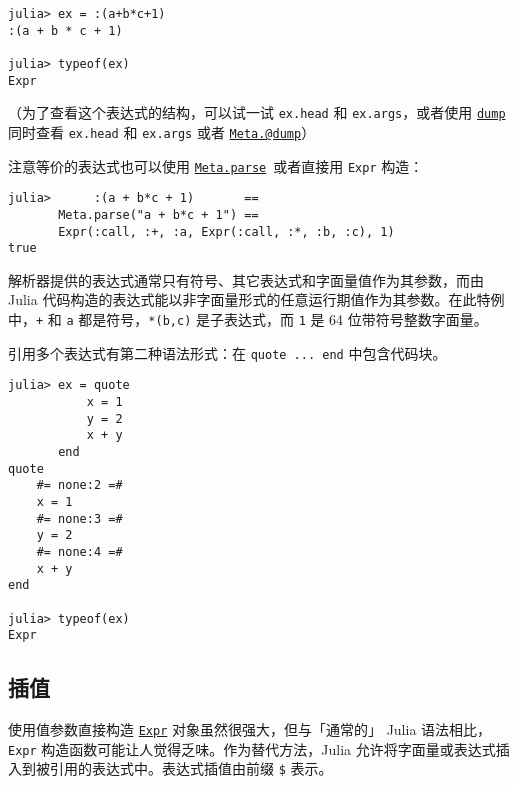 \begin{verbatim}
julia> ex = :(a+b*c+1)
:(a + b * c + 1)

julia> typeof(ex)
Expr
\end{verbatim}



（为了查看这个表达式的结构，可以试一试 \texttt{ex.head} 和 \texttt{ex.args}，或者使用 \hyperlink{15981569052160951906}{\texttt{dump}} 同时查看 \texttt{ex.head} 和 \texttt{ex.args} 或者 \hyperlink{11314997131411442967}{\texttt{Meta.@dump}}）



注意等价的表达式也可以使用 \hyperlink{9794549254908071788}{\texttt{Meta.parse}} 或者直接用 \texttt{Expr} 构造：




\begin{verbatim}
julia>      :(a + b*c + 1)       ==
       Meta.parse("a + b*c + 1") ==
       Expr(:call, :+, :a, Expr(:call, :*, :b, :c), 1)
true
\end{verbatim}



解析器提供的表达式通常只有符号、其它表达式和字面量值作为其参数，而由 Julia 代码构造的表达式能以非字面量形式的任意运行期值作为其参数。在此特例中，\texttt{+} 和 \texttt{a} 都是符号，\texttt{*(b,c)} 是子表达式，而 \texttt{1} 是 64 位带符号整数字面量。



引用多个表达式有第二种语法形式：在 \texttt{quote ... end} 中包含代码块。




\begin{verbatim}
julia> ex = quote
           x = 1
           y = 2
           x + y
       end
quote
    #= none:2 =#
    x = 1
    #= none:3 =#
    y = 2
    #= none:4 =#
    x + y
end

julia> typeof(ex)
Expr
\end{verbatim}



\hypertarget{6473060285850683914}{}


\subsection{插值}



使用值参数直接构造 \hyperlink{17120496304147995299}{\texttt{Expr}} 对象虽然很强大，但与「通常的」 Julia 语法相比，\texttt{Expr} 构造函数可能让人觉得乏味。作为替代方法，Julia 允许将字面量或表达式插入到被引用的表达式中。表达式插值由前缀 \texttt{\$} 表示。




